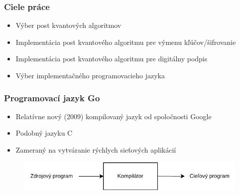 \documentclass[%
  14pt,       				%
	t,                  %
	aspectratio=1610,   %
	unicode,						%
]{beamer}				    	%
\begin{document}
\disablenavigationsymbols

\maketitle


\begin{frame}[c]
	\frametitle{Ciele práce}
	\large{\begin{itemize}
			\item Výber post kvantových algoritmov
			\item Implementácia post kvantového algoritmu pre výmenu kľúčov/šifrovanie
			\item Implementácia post kvantového algoritmu pre digitálny podpis
			\item Výber implementačného programovacieho jazyka
		\end{itemize}}

\end{frame}



\begin{frame}[c]
	\frametitle{Programovací jazyk Go}
	\large{\begin{itemize}
			\item Relatívne nový (2009) kompilovaný jazyk od spoločnosti Google
			\item Podobný jazyku C
			\item Zameraný na vytváranie rýchlych sieťových aplikácií
		\end{itemize}}

	\begin{figure}[htbp]
		\centering
		\includegraphics[width=\textwidth]{pictures/compiler_sk.pdf}
	\end{figure}
\end{frame}
\end{document}
